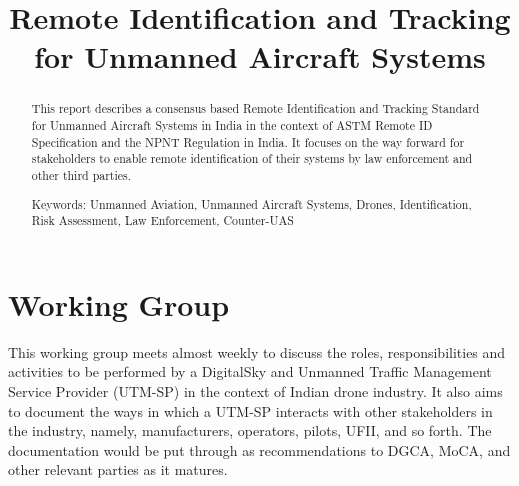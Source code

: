\documentclass{ua_wgs_base}
\begin{document}
\title{Remote Identification and Tracking for Unmanned Aircraft Systems}
\author{\printworkinggroup}

\maketitle
\cleardoublepage{}
\begin{abstract}
This report describes a consensus based Remote Identification and
Tracking Standard for Unmanned Aircraft Systems in India in the context
of ASTM 
Remote ID Specification and the NPNT Regulation
in India. It focuses on the way forward for stakeholders to enable
remote identification of their systems by law enforcement and other
third parties.

Keywords: Unmanned Aviation, Unmanned Aircraft Systems, Drones, Identification,
Risk Assessment, Law Enforcement, Counter-UAS

\tableofcontents{}
\end{abstract}

\chapter*{Working Group\label{sec:wg}}


This working group meets almost weekly to discuss the roles, responsibilities
and activities to be performed by a DigitalSky and Unmanned Traffic Management Service
Provider (UTM-SP)
in the context of Indian drone industry. It also aims to document
the ways in which a UTM-SP interacts with other stakeholders in the
industry, namely, manufacturers, operators, pilots, UFII, and so forth.
The documentation would be put through as recommendations to DGCA,
MoCA,
and other relevant parties as it matures.
\end{document}

